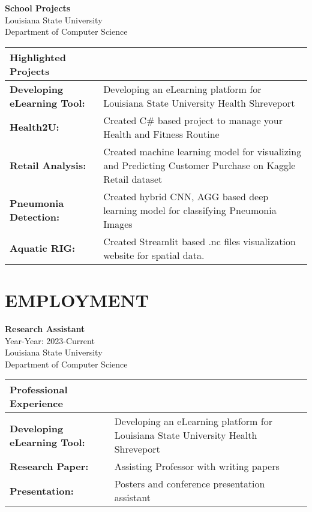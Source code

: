 \documentclass[a4paper,9pt]{article}
\begin{document}
\noindent
\textbf{School Projects} \\
Louisiana State University \\
Department of Computer Science \\
\begin{tabular}{|p{}|p{}|}
\hline
\textbf{Highlighted Projects} & \\
\hline
\textbf{Developing eLearning Tool:} & Developing an eLearning platform for Louisiana State University Health Shreveport \\
\hline
\textbf{Health2U:} & Created C\# based project to manage your Health and Fitness Routine \\
\hline
\textbf{Retail Analysis:} & Created machine learning model for visualizing and Predicting Customer Purchase on Kaggle Retail dataset \\
\hline
\textbf{Pneumonia Detection:} & Created hybrid CNN, AGG based deep learning model for classifying Pneumonia Images \\
\hline
\textbf{Aquatic RIG:} & Created Streamlit based .nc files visualization website for spatial data. \\
\hline
\end{tabular}

\section*{EMPLOYMENT}

\noindent
\textbf{Research Assistant} \\
Year-Year: 2023-Current \\
Louisiana State University \\
Department of Computer Science \\
\begin{tabular}{|p{}|p{}|}
\hline
\textbf{Professional Experience} & \\
\hline
\textbf{Developing eLearning Tool:} & Developing an eLearning platform for Louisiana State University Health Shreveport \\
\hline
\textbf{Research Paper:} & Assisting Professor with writing papers \\
\hline
\textbf{Presentation:} & Posters and conference presentation assistant \\
\hline
\end{tabular}
\vspace{\baselineskip}
\end{document}
